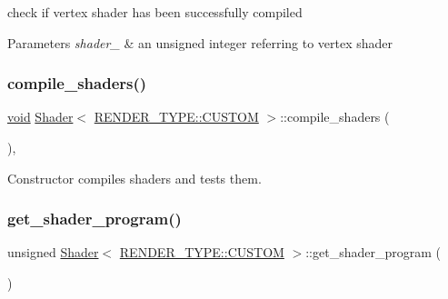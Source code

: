 check if vertex shader has been successfully compiled 


\begin{DoxyParams}{Parameters}
{\em shader\+\_\+} & an unsigned integer referring to vertex shader \\
\hline
\end{DoxyParams}
\mbox{\label{classShader_3_01RENDER__TYPE_1_1CUSTOM_01_4_aede40b234ac1e38be9d0f9f2a60a26ab}} 
\subsubsection{\texorpdfstring{compile\+\_\+shaders()}{compile\_shaders()}}
{\footnotesize\ttfamily \mbox{\hyperlink{glad_8h_a950fc91edb4504f62f1c577bf4727c29}{void}} \mbox{\hyperlink{classShader}{Shader}}$<$ \mbox{\hyperlink{shader__class_8hpp_a24e288e18eb7b6e01de7565001fedb60a72baef04098f035e8a320b03ad197818}{R\+E\+N\+D\+E\+R\+\_\+\+T\+Y\+P\+E\+::\+C\+U\+S\+T\+OM}} $>$\+::compile\+\_\+shaders (\begin{DoxyParamCaption}{ }\end{DoxyParamCaption})\hspace{0.3cm}{\ttfamily [inline]}, {\ttfamily [protected]}}



Constructor compiles shaders and tests them. 

\mbox{\label{classShader_3_01RENDER__TYPE_1_1CUSTOM_01_4_adf4d1f7a937d11102268dfb8fc7f2f9e}} 
\subsubsection{\texorpdfstring{get\+\_\+shader\+\_\+program()}{get\_shader\_program()}}
{\footnotesize\ttfamily unsigned \mbox{\hyperlink{classShader}{Shader}}$<$ \mbox{\hyperlink{shader__class_8hpp_a24e288e18eb7b6e01de7565001fedb60a72baef04098f035e8a320b03ad197818}{R\+E\+N\+D\+E\+R\+\_\+\+T\+Y\+P\+E\+::\+C\+U\+S\+T\+OM}} $>$\+::get\+\_\+shader\+\_\+program (\begin{DoxyParamCaption}{ }\end{DoxyParamCaption})\hspace{0.3cm}{\ttfamily [inline]}}

